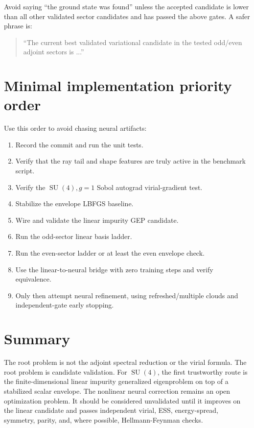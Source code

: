 \documentclass[11pt]{article}
\newcommand{\SU}{\operatorname{SU}}
\begin{document}
Avoid saying ``the ground state was found'' unless the accepted candidate is lower than all other validated sector candidates and has passed the above gates. A safer phrase is:
\begin{quote}
``The current best validated variational candidate in the tested odd/even adjoint sectors is ...''
\end{quote}

\section{Minimal implementation priority order}

Use this order to avoid chasing neural artifacts:

\begin{enumerate}
\item Record the commit and run the unit tests.
\item Verify that the ray tail and shape features are truly active in the benchmark script.
\item Verify the \(\SU(4),g=1\) Sobol autograd virial-gradient test.
\item Stabilize the envelope LBFGS baseline.
\item Wire and validate the linear impurity GEP candidate.
\item Run the odd-sector linear basis ladder.
\item Run the even-sector ladder or at least the even envelope check.
\item Use the linear-to-neural bridge with zero training steps and verify equivalence.
\item Only then attempt neural refinement, using refreshed/multiple clouds and independent-gate early stopping.
\end{enumerate}

\section{Summary}

The root problem is not the adjoint spectral reduction or the virial formula. The root problem is candidate validation. For \(\SU(4)\), the first trustworthy route is the finite-dimensional linear impurity generalized eigenproblem on top of a stabilized scalar envelope. The nonlinear neural correction remains an open optimization problem. It should be considered unvalidated until it improves on the linear candidate and passes independent virial, ESS, energy-spread, symmetry, parity, and, where possible, Hellmann-Feynman checks.
\end{document}
